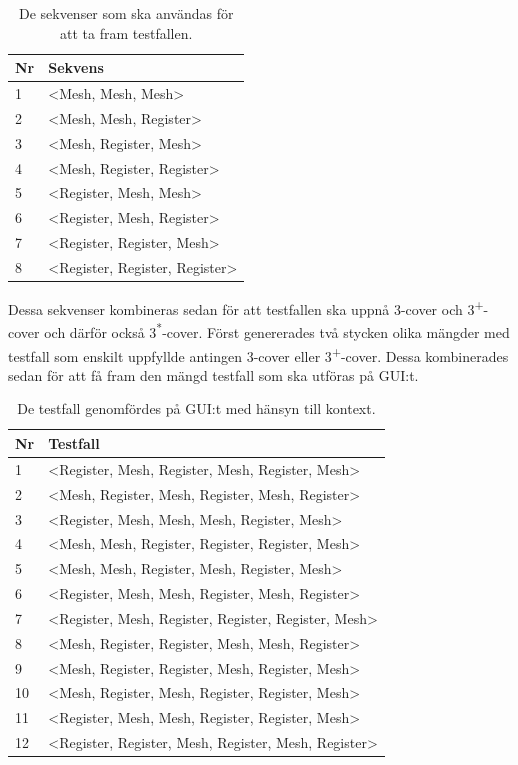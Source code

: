 \begin{table}[h]
	\caption{De sekvenser som ska användas för att ta fram testfallen.}
	\label{tbl:test_seq}
	\centering
\begin{tabular}{|l|l|}
	\hline
	\textbf{Nr} & \textbf{Sekvens} \\
	\hline
	1 & <Mesh, Mesh, Mesh> \\
	\hline
	2 & <Mesh, Mesh, Register> \\
	\hline
	3 & <Mesh, Register, Mesh> \\
	\hline
	4 & <Mesh, Register, Register> \\
	\hline
	5 & <Register, Mesh, Mesh> \\
	\hline
	6 & <Register, Mesh, Register> \\
	\hline
	7 & <Register, Register, Mesh> \\
	\hline
	8 & <Register, Register, Register> \\
	\hline
\end{tabular}
\end{table}

Dessa sekvenser kombineras sedan för att testfallen ska uppnå 3-cover och 3\textsuperscript{+}-cover och därför också 3\textsuperscript{*}-cover. Först genererades två stycken olika  mängder med testfall som enskilt uppfyllde antingen 3-cover eller 3\textsuperscript{+}-cover. Dessa kombinerades sedan för att få fram den mängd testfall som ska utföras på GUI:t.

\begin{table}[h]
	\caption{De testfall genomfördes på GUI:t med hänsyn till kontext.}
	\label{tbl:test_context}
	\centering
	\begin{tabular}{|l|l|}
		\hline
		\textbf{Nr} & \textbf{Testfall} \\
		\hline
		1 & <Register, Mesh, Register, Mesh, Register, Mesh> \\
		\hline
		2 & <Mesh, Register, Mesh, Register, Mesh, Register> \\
		\hline
		3 & <Register, Mesh, Mesh, Mesh, Register, Mesh> \\
		\hline
		4 & <Mesh, Mesh, Register, Register, Register, Mesh> \\
		\hline
		5 & <Mesh, Mesh, Register, Mesh, Register, Mesh> \\
		\hline
		6 & <Register, Mesh, Mesh, Register, Mesh, Register> \\
		\hline
		7 & <Register, Mesh, Register, Register, Register, Mesh> \\
		\hline
		8 & <Mesh, Register, Register, Mesh, Mesh, Register> \\
		\hline
		9 & <Mesh, Register, Register, Mesh, Register, Mesh> \\
		\hline
		10 & <Mesh, Register, Mesh, Register, Register, Mesh> \\
		\hline
		11 & <Register, Mesh, Mesh, Register, Register, Mesh> \\
		\hline
		12 & <Register, Register, Mesh, Register, Mesh, Register> \\
		\hline
	\end{tabular}
\end{table}

